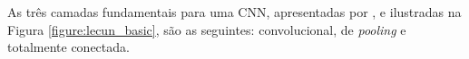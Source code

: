 \par As três camadas fundamentais para uma CNN, apresentadas por , e ilustradas na Figura \ref{figure:lecun_basic}, são as seguintes: convolucional, de \textit{pooling} e totalmente conectada.







